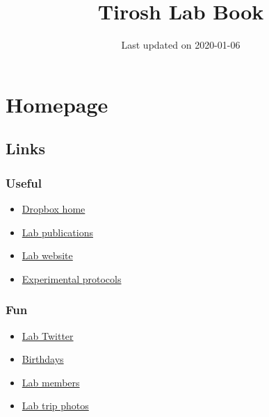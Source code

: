 \documentclass[]{book}
\title{Tirosh Lab Book}
\author{}
\date{\vspace{-2.5em}Last updated on 2020-01-06}
\providecommand{\tightlist}{%
  \setlength{\itemsep}{0pt}\setlength{\parskip}{0pt}}
\begin{document}
\maketitle

{
\setcounter{tocdepth}{1}
\tableofcontents
}
\chapter{Homepage}\label{homepage}

\section{Links}\label{links}

\subsection{Useful}\label{useful}

\begin{itemize}
\tightlist
\item
  \href{https://www.dropbox.com/home/Tirosh\%20Lab}{Dropbox home}\\
\item
  \href{http://www.weizmann.ac.il/mcb/tirosh/publications-0}{Lab
  publications}\\
\item
  \href{http://www.weizmann.ac.il/mcb/tirosh/}{Lab website}\\
\item
  \href{https://www.dropbox.com/sh/javjoi26i5k5f6t/AADAX4RgSZUFuBwtS6TRE3wua?dl=0}{Experimental
  protocols}
\end{itemize}

\subsection{Fun}\label{fun}

\begin{itemize}
\tightlist
\item
  \href{https://twitter.com/tiroshlab}{Lab Twitter}\\
\item
  \href{https://www.dropbox.com/s/zwss5fg9rkoz7pp/lab\%20bday\%20list.xlsx?dl=0}{Birthdays}\\
\item
  \href{http://www.weizmann.ac.il/mcb/tirosh/group-members}{Lab
  members}\\
\item
  \href{http://www.weizmann.ac.il/mcb/tirosh/pictures}{Lab trip photos}
\end{itemize}
\end{document}
